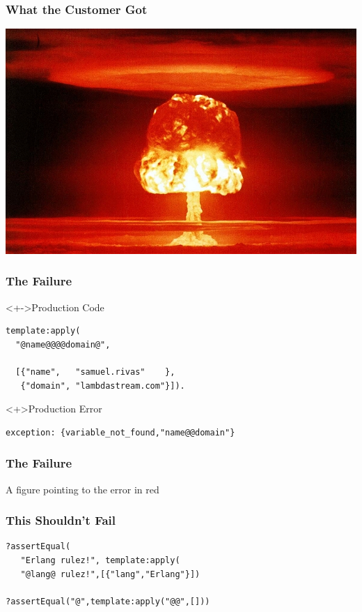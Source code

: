 \documentclass[xcolor=dvipsnames]{beamer}
\begin{document}
\begin{frame}
  \frametitle{What the Customer Got}
  \includegraphics[width=\textwidth]{images/nuclear}
\end{frame}

\begin{frame}[fragile]
  \frametitle{The Failure}

\begin{block}<+->{Production Code}
\begin{verbatim}
template:apply(
  "@name@@@@domain@",

  [{"name",   "samuel.rivas"    },
   {"domain", "lambdastream.com"}]).
\end{verbatim}
\end{block}

\begin{alertblock}<+>{Production Error}
\begin{verbatim}
exception: {variable_not_found,"name@@domain"}
\end{verbatim}
\end{alertblock}
\end{frame}

\begin{frame}
  \frametitle{The Failure}

  A figure pointing to the error in red
\end{frame}

\begin{frame}[fragile]
  \frametitle{This Shouldn't Fail}

\begin{verbatim}
?assertEqual(
   "Erlang rulez!", template:apply(
   "@lang@ rulez!",[{"lang","Erlang"}])

?assertEqual("@",template:apply("@@",[]))
\end{verbatim}
\end{frame}
\end{document}

